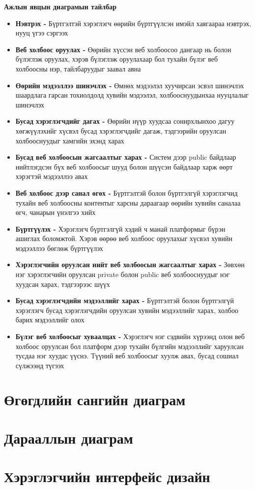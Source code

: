 \pagebreak
\textbf{Ажлын явцын диаграмын тайлбар}

\begin{itemize}
	\item \textbf{Нэвтрэх -} Бүртгэлтэй хэрэглэгч өөрийн бүртгүүлсэн имэйл хаягаараа нэвтрэх, нууц үгээ сэргээх
	\item \textbf{Веб холбоос оруулах -} Өөрийн хүссэн веб холбоосоо дангаар нь болон бүлэглэж оруулах, хэрэв бүлэглэж оруулахаар бол тухайн бүлэг веб холбоосны нэр, тайлбаруудыг заавал авна
	\item \textbf{Өөрийн мэдээллээ шинэчлэх -} Өмнөх мэдээлэл хуучирсан эсвэл шинэчлэх шаардлага гарсан тохиолдолд хувийн мэдээлэл, холбооснуудынхаа нууцлалыг шинэчлэх
	\item \textbf{Бусад хэрэглэгчдийг дагах -} Өөрийн нүүр хуудсаа сонирхлынхоо дагуу хөгжүүлэхийг хүсвэл бусад хэрэглэгчдийг дагаж, тэдгээрийн оруулсан холбооснуудыг хамгийн эхэнд харах
	\item \textbf{Бусад веб холбоосын жагсаалтыг харах -} Систем дээр public байдлаар нийтлэгдсэн бүх веб холбоосыг шууд болон шүүсэн байдлаар харж өөрт хэрэгтэй мэдээллээ авах
	\item \textbf{Веб холбоос дээр санал өгөх -} Бүртгэлтэй болон бүртгэлгүй хэрэглэгчид тухайн веб холбоосны контентыг харсны дараагаар өөрийн хувийн саналаа өгч, чанарын үнэлгээ хийх 
	\item \textbf{Бүртгүүлэх -} Хэрэглэгч бүртгэлгүй хэдий ч манай платформыг бүрэн ашиглах боломжтой. Хэрэв өөрөө веб холбоос оруулахыг хүсвэл хувийн мэдээллээ бөглөж бүртгүүлэх
	\item \textbf{Хэрэглэгчийн оруулсан нийт веб холбоосын жагсаалтыг харах -} Зөвхөн нэг хэрэглэгчийн оруулсан private болон public веб холбооснуудыг нэг хуудсан харах, тэдгээрээс шүүх
	\item \textbf{Бусад хэрэглэгчдийн мэдээллийг харах -} Бүртгэлтэй болон бүртгэлгүй хэрэглэгч бусад хэрэглэгчдийн оруулсан хувийн мэдээллийг харах, холбоо барих мэдээллийг олох
	\item \textbf{Бүлэг веб холбоосыг хуваалцах -} Хэрэглэгч нэг сэдвийн хүрээнд олон веб холбоос оруулсан бол платформ дээр тухайн бүлгийн мэдээллийг харуулсан тусдаа нэг хуудас үүснэ. Түүний веб холбоосыг хуулж авах, бусад сошиал сүлжээнд түгээх
\end{itemize}

\section{Өгөгдлийн сангийн диаграм}
\section{Дарааллын диаграм}
\section{Хэрэглэгчийн интерфейс дизайн}


